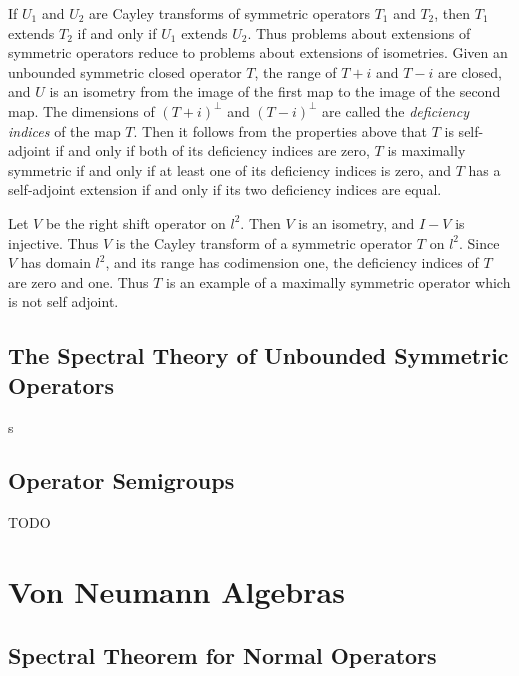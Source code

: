 If $U_1$ and $U_2$ are Cayley transforms of symmetric operators $T_1$ and $T_2$, then $T_1$ extends $T_2$ if and only if $U_1$ extends $U_2$. Thus problems about extensions of symmetric operators reduce to problems about extensions of isometries. Given an unbounded symmetric closed operator $T$, the range of $T + i$ and $T - i$ are closed, and $U$ is an isometry from the image of the first map to the image of the second map. The dimensions of $(T + i)^\perp$ and $(T - i)^\perp$ are called the \emph{deficiency indices} of the map $T$. Then it follows from the properties above that $T$ is self-adjoint if and only if both of its deficiency indices are zero, $T$ is maximally symmetric if and only if at least one of its deficiency indices is zero, and $T$ has a self-adjoint extension if and only if its two deficiency indices are equal.

\begin{example}
    Let $V$ be the right shift operator on $l^2$. Then $V$ is an isometry, and $I - V$ is injective. Thus $V$ is the Cayley transform of a symmetric operator $T$ on $l^2$. Since $V$ has domain $l^2$, and its range has codimension one, the deficiency indices of $T$ are zero and one. Thus $T$ is an example of a maximally symmetric operator which is not self adjoint.
\end{example}

\section{The Spectral Theory of Unbounded Symmetric Operators}

s






\section{Operator Semigroups}

TODO






\chapter{Von Neumann Algebras}





\section{Spectral Theorem for Normal Operators}

